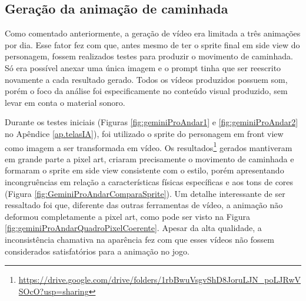 \FloatBarrier
\subsection{Geração da animação de caminhada}
\label{s.gemini.animacaoAndar}

Como comentado anteriormente, a geração de vídeo era limitada a três animações por dia. Esse fator fez com que, antes mesmo de ter o sprite final em side view do personagem, fossem realizados testes para produzir o movimento de caminhada. Só era possível anexar uma única imagem e o prompt tinha que ser reescrito novamente a cada resultado gerado. Todos os vídeos produzidos possuem som, porém o foco da análise foi especificamente no conteúdo visual produzido, sem levar em conta o material sonoro.


Durante os testes iniciais (Figuras \ref{fig:geminiProAndar1} e \ref{fig:geminiProAndar2} no Apêndice \ref{ap.telasIA}), foi utilizado o sprite do personagem em front view como imagem a ser transformada em vídeo. Os resultados\footnote{\url{https://drive.google.com/drive/folders/1rbBwuVsgvShD8JoruLJN_poLJRwVSOcO?usp=sharing}} gerados mantiveram em grande parte a pixel art, criaram precisamente o movimento de caminhada e formaram o sprite em side view consistente com o estilo, porém apresentando incongruências em relação a características físicas específicas e aos tons de cores (Figura \ref{fig:GeminiProAndarComparaSprite}). Um detalhe interessante de ser ressaltado foi que, diferente das outras ferramentas de vídeo, a animação não deformou completamente a pixel art, como pode ser visto na Figura \ref{fig:geminiProAndarQuadroPixelCoerente}. Apesar da alta qualidade, a inconsistência chamativa na aparência fez com que esses vídeos não fossem considerados satisfatórios para a animação no jogo.

